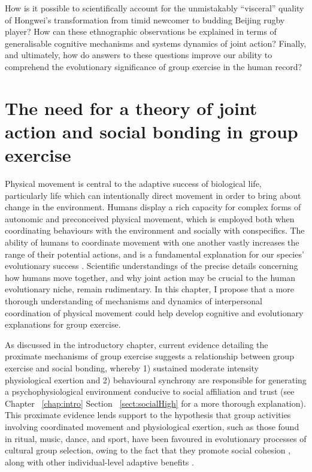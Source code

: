 \begin{CJK}{UTF8}{gbsn}
How is it possible to scientifically account for the unmistakably ``visceral'' quality of Hongwei's transformation from timid newcomer to budding Beijing rugby player?  How can these ethnographic observations be explained in terms of generalisable cognitive mechanisms and systems dynamics of joint action?  Finally, and ultimately, how do answers to these questions improve our ability to comprehend the evolutionary significance of group exercise in the human record?



\section{The need for a theory of joint action and social bonding in group exercise}

Physical movement is central to the adaptive success of biological life, particularly life which can intentionally direct movement in order to bring about change in the environment.  Humans display a rich capacity for complex forms of autonomic and preconceived physical movement, which is employed both when coordinating behaviours with the environment and socially with conspecifics.  The ability of humans to coordinate movement with one another vastly increases the range of their potential actions, and is a fundamental explanation for our species' evolutionary success \citep{Tomasello2009}.  Scientific understandings of the precise details concerning how humans move together, and why joint action may be crucial to the human evolutionary niche, remain rudimentary.  In this chapter, I propose that a more thorough understanding of mechanisms and dynamics of interpersonal coordination of physical movement could help develop cognitive and evolutionary explanations for group exercise.

As discussed in the introductory chapter, current evidence detailing the proximate mechanisms of group exercise suggests a relationship between group exercise and social bonding, whereby 1) sustained moderate intensity physiological exertion and 2) behavioural synchrony are responsible for generating a psychophysiological environment conducive to social affiliation and trust (see Chapter ~\ref{chap:intro} Section ~\ref{sect:socialHigh} for a more thorough explanation).  This proximate evidence lends support to the hypothesis that group activities involving coordinated movement and physiological exertion, such as those found in ritual, music, dance, and sport, have been favoured in evolutionary processes of cultural group selection, owing to the fact that they promote social cohesion \cite{Dunbar2010}, along with other individual-level adaptive benefits \citep{Cohen2017}.


\end{CJK}
